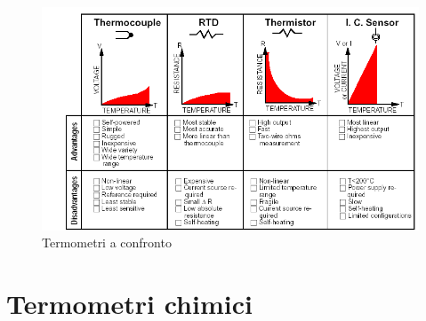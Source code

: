 \documentclass[a4paper, 15pt]{article}
\begin{document}
\newpage	
\begin{figure}[H]
	\centering
	\includegraphics[width=1\linewidth]{immagini/screenshot036}
	\caption{Termometri a confronto}
	\label{fig:screenshot036}
\end{figure}


\section{Termometri chimici}
\end{document}
